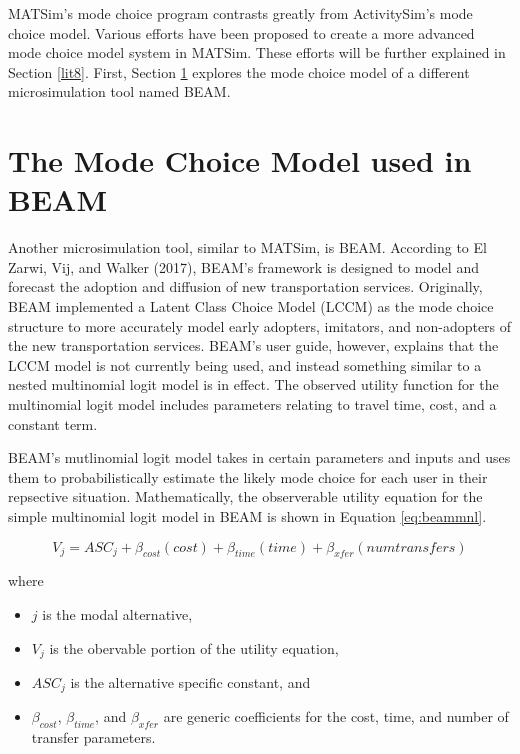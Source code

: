 \documentclass[12pt, oneside, openright]{byuthesis}
\providecommand{\tightlist}{%
  \setlength{\itemsep}{0pt}\setlength{\parskip}{0pt}}
\begin{document}
MATSim's mode choice program contrasts greatly from ActivitySim's mode choice model. Various efforts have been proposed to create a more advanced mode choice model system in MATSim. These efforts will be further explained in Section \ref{lit8}. First, Section \ref{lit7} explores the mode choice model of a different microsimulation tool named BEAM.

\hypertarget{lit7}{%
\section{The Mode Choice Model used in BEAM}\label{lit7}}

Another microsimulation tool, similar to MATSim, is BEAM. According to El Zarwi, Vij, and Walker (2017), BEAM's framework is designed to model and forecast the adoption and diffusion of new transportation services. Originally, BEAM implemented a Latent Class Choice Model (LCCM) as the mode choice structure to more accurately model early adopters, imitators, and non-adopters of the new transportation services. BEAM's user guide, however, explains that the LCCM model is not currently being used, and instead something similar to a nested multinomial logit model is in effect. The observed utility function for the multinomial logit model includes parameters relating to travel time, cost, and a constant term.

BEAM's mutlinomial logit model takes in certain parameters and inputs and uses them to probabilistically estimate the likely mode choice for each user in their repsective situation. Mathematically, the observerable utility equation for the simple multinomial logit model in BEAM is shown in Equation \eqref{eq:beammnl}.

\begin{equation}
  V_j = ASC_j + \beta_{cost}(cost) + \beta_{time}(time) + \beta_{xfer}(numtransfers) 
    \label{eq:beammnl}
\end{equation}

where

\begin{itemize}
\tightlist
\item
  \(j\) is the modal alternative,
\item
  \(V_j\) is the obervable portion of the utility equation,
\item
  \(ASC_j\) is the alternative specific constant, and
\item
  \(\beta_{cost}\), \(\beta_{time}\), and \(\beta_{xfer}\) are generic coefficients for the cost, time, and number of transfer parameters.
\end{itemize}
\end{document}
